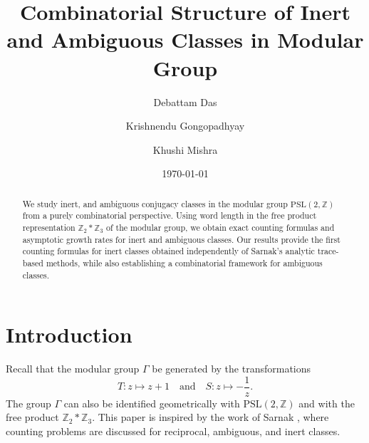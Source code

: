 \documentclass[a4paper,12pt]{amsart}
\numberwithin{equation}{section}
\theoremstyle{definition}
\numberwithin{equation}{section}
\begin{document}
\title[Combinatorial Structure of Inert and Ambiguous Classes]{Combinatorial Structure of Inert and Ambiguous Classes in Modular Group}
\author[D. Das]{Debattam Das}
\address{Indian Institute of Technology Kanpur, Kanpur 208016, Uttar Pradesh, India}
\author[K. Gongopadhyay]{Krishnendu Gongopadhyay }
\address{Indian Institute of Science Education and Research (IISER) Mohali, Knowledge City,  Sector 81, S.A.S. Nagar 140306, Punjab, India}
\author[K. Mishra]{Khushi Mishra}
\address{Indian Institute of Science Education and Research (IISER) Mohali, Knowledge City,  Sector 81, S.A.S. Nagar 140306, Punjab, India}
\makeatletter
{}
\makeatother
{}
\date{\today}
    \begin{abstract}
We study inert, and ambiguous conjugacy classes in the modular group $\mathrm{PSL}(2,\mathbb{Z})$ from a purely combinatorial perspective. Using word length in the free product representation $\mathbb{Z}_2 * \mathbb{Z}_3$ of the modular group, we obtain exact counting formulas and asymptotic growth rates for inert and ambiguous classes. Our results provide the first counting formulas for inert classes obtained independently of Sarnak’s analytic trace-based methods, while also establishing a combinatorial framework for ambiguous classes. 
\end{abstract}

\maketitle

\section{Introduction}
Recall that the modular group $\Gamma$ be generated by the transformations  
\[
T: z \mapsto z+1 \quad \text{and} \quad S: z \mapsto -\frac{1}{z}.
\]
The group $\Gamma$ can also be identified geometrically with $\mathrm{PSL}(2,\mathbb Z)$ and with the free product $\mathbb{Z}_2 \ast  \mathbb{Z}_3$.  This paper is inspired by the work of Sarnak \cite{sarnak}, where counting problems are discussed for reciprocal, ambiguous, and inert classes.
\end{document}
